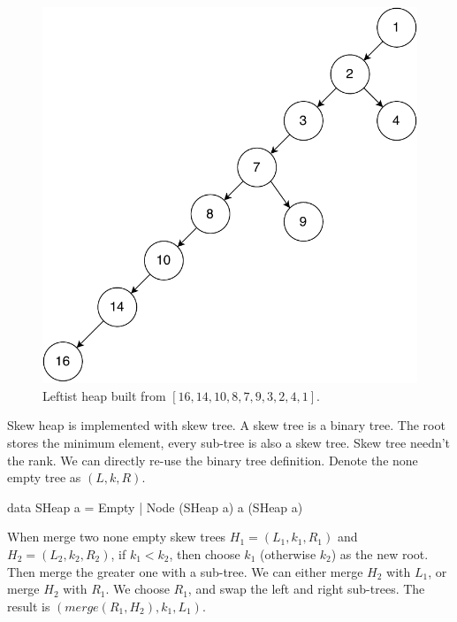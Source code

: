 \documentclass[b5paper]{article}
\begin{document}
\begin{figure}[htbp]
  \centering
  \includegraphics[scale=0.45]{img/unbalanced-leftist-tree}
  \caption{Leftist heap built from $[16, 14, 10, 8, 7, 9, 3, 2, 4, 1]$.}
  \label{fig:unbalanced-leftist-tree}
\end{figure}

Skew heap is implemented with skew tree. A skew tree is a binary tree. The root stores the minimum element, every sub-tree is also a skew tree. Skew tree needn't the rank. We can directly re-use the binary tree definition. Denote the none empty tree as $(L, k, R)$.

\begin{Haskell}
data SHeap a = Empty | Node (SHeap a) a (SHeap a)
\end{Haskell}

   

When merge two none empty skew trees $H_1 = (L_1, k_1, R_1)$ and $H_2 =(L_2, k_2, R_2)$, if $k_1 < k_2$, then choose $k_1$ (otherwise $k_2$) as the new root. Then merge the greater one with a sub-tree. We can either merge $H_2$ with $L_1$, or merge $H_2$ with $R_1$. We choose $R_1$, and swap the left and right sub-trees. The result is $(\textit{merge}(R_1, H_2), k_1, L_1)$.
\end{document}
